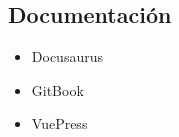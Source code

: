 \subsection{Documentación}
\begin{itemize}
    \item Docusaurus
    \item GitBook
    \item VuePress
\end{itemize}


